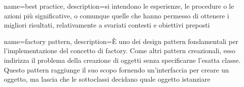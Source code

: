 {
	name=best practice,
	description={si intendono le esperienze, le procedure o le azioni più significative, o comunque quelle che hanno permesso di ottenere i migliori risultati, relativamente a svariati contesti e obiettivi preposti}
}

{
	name=factory pattern,
	description={\`E uno dei design pattern fondamentali per l'implementazione del concetto di factory. Come altri pattern creazionali, esso indirizza il problema della creazione di oggetti senza specificarne l'esatta classe. Questo pattern raggiunge il suo scopo fornendo un'interfaccia per creare un oggetto, ma lascia che le sottoclassi decidano quale oggetto istanziare}
}